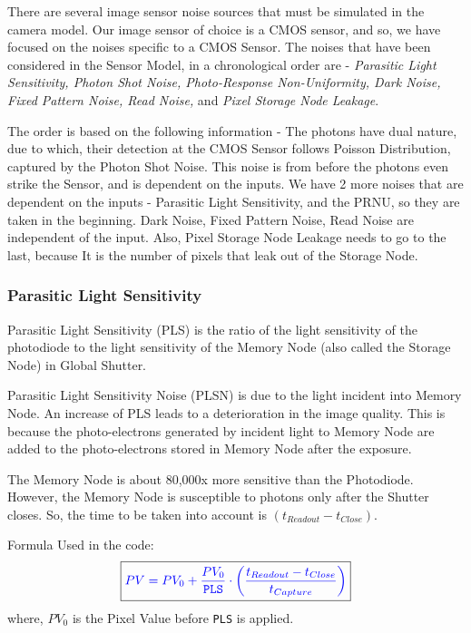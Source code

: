 There are several image sensor noise sources that must be simulated in the camera model. Our image sensor of choice is a CMOS sensor, and so, we have focused on the noises specific to a CMOS Sensor. The noises that have been considered in the Sensor Model, in a chronological order are - \emph{Parasitic Light Sensitivity, Photon Shot Noise, Photo-Response Non-Uniformity, Dark Noise, Fixed Pattern Noise, Read Noise,} and \emph{Pixel Storage Node Leakage}.

The order is based on the following information - 
The photons have dual nature, due to which, their detection at the CMOS Sensor follows Poisson Distribution, captured by the Photon Shot Noise. This noise is from before the photons even strike the Sensor, and is dependent on the inputs. We have 2 more noises that are dependent on the inputs - Parasitic Light Sensitivity, and the PRNU, so they are taken in the beginning. Dark Noise, Fixed Pattern Noise, Read Noise are independent of the input. Also, Pixel Storage Node Leakage needs to go to the last, because It is the number of pixels that leak out of the Storage Node.


\subsubsection{Parasitic Light Sensitivity} %
Parasitic Light Sensitivity (PLS) is the ratio of the light sensitivity of the photodiode to the light sensitivity of the Memory Node (also called the Storage Node) in Global Shutter. \newline

Parasitic Light Sensitivity Noise (PLSN) is due to the light incident into Memory Node. An increase of PLS leads to a deterioration in the image quality.  This  is  because  the  photo-electrons  generated  by  incident  light  to  Memory Node  are  added  to  the  photo-electrons stored in Memory Node after the exposure. \newline

The Memory Node is about 80,000x more sensitive than the Photodiode. However, the Memory Node is susceptible to photons only after the Shutter closes. So, the time to be taken into account is $(t_{Readout} - t_{Close})$. \newline

Formula Used in the code:
\begin{equation}
    \begin{aligned}
        \boxed{ \color{blue} PV =  PV_0 + \frac{PV_0}{\texttt{PLS}} \cdot \left(\frac{t_{Readout} - t_{Close}}{t_{Capture}}\right) \color{black}} 
    \end{aligned}
\end{equation}
where, $PV_0$ is the Pixel Value before \texttt{PLS} is applied. 

